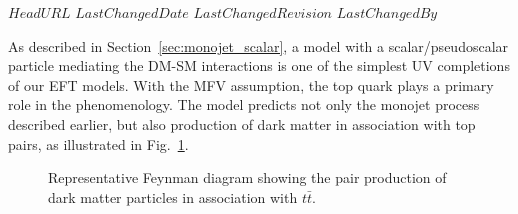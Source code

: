\svnidlong
{$HeadURL$}
{$LastChangedDate$}
{$LastChangedRevision$}
{$LastChangedBy$}

As described in Section~\ref{sec:monojet_scalar}, a model with a scalar/pseudoscalar particle mediating the DM-SM interactions is one of the simplest UV completions of our EFT models.  With the MFV assumption, the top quark plays
a primary role in the phenomenology.   The model predicts not only
the monojet process described earlier, but also production of dark matter
in association with top pairs, as illustrated in Fig.~\ref{fig:TTbarPhi}.

\begin{figure}[t!]
\centering
  \textwidth
  \begin{feynmandiagram}[modelTTbarMET]
  \end{feynmandiagram}
\caption{Representative Feynman
diagram showing the pair production of dark matter particles in
association with $t\bar t$.}
\label{fig:TTbarPhi}
\end{figure}




